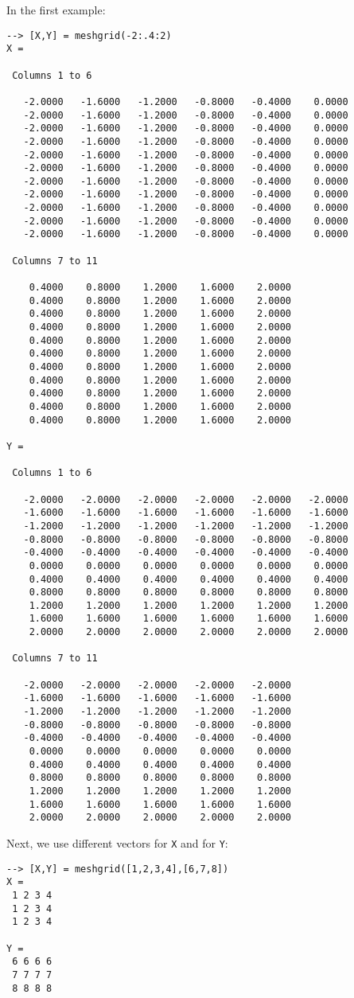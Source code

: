 In the first example:
\begin{verbatim}
--> [X,Y] = meshgrid(-2:.4:2)
X = 

 Columns 1 to 6

   -2.0000   -1.6000   -1.2000   -0.8000   -0.4000    0.0000 
   -2.0000   -1.6000   -1.2000   -0.8000   -0.4000    0.0000 
   -2.0000   -1.6000   -1.2000   -0.8000   -0.4000    0.0000 
   -2.0000   -1.6000   -1.2000   -0.8000   -0.4000    0.0000 
   -2.0000   -1.6000   -1.2000   -0.8000   -0.4000    0.0000 
   -2.0000   -1.6000   -1.2000   -0.8000   -0.4000    0.0000 
   -2.0000   -1.6000   -1.2000   -0.8000   -0.4000    0.0000 
   -2.0000   -1.6000   -1.2000   -0.8000   -0.4000    0.0000 
   -2.0000   -1.6000   -1.2000   -0.8000   -0.4000    0.0000 
   -2.0000   -1.6000   -1.2000   -0.8000   -0.4000    0.0000 
   -2.0000   -1.6000   -1.2000   -0.8000   -0.4000    0.0000 

 Columns 7 to 11

    0.4000    0.8000    1.2000    1.6000    2.0000 
    0.4000    0.8000    1.2000    1.6000    2.0000 
    0.4000    0.8000    1.2000    1.6000    2.0000 
    0.4000    0.8000    1.2000    1.6000    2.0000 
    0.4000    0.8000    1.2000    1.6000    2.0000 
    0.4000    0.8000    1.2000    1.6000    2.0000 
    0.4000    0.8000    1.2000    1.6000    2.0000 
    0.4000    0.8000    1.2000    1.6000    2.0000 
    0.4000    0.8000    1.2000    1.6000    2.0000 
    0.4000    0.8000    1.2000    1.6000    2.0000 
    0.4000    0.8000    1.2000    1.6000    2.0000 

Y = 

 Columns 1 to 6

   -2.0000   -2.0000   -2.0000   -2.0000   -2.0000   -2.0000 
   -1.6000   -1.6000   -1.6000   -1.6000   -1.6000   -1.6000 
   -1.2000   -1.2000   -1.2000   -1.2000   -1.2000   -1.2000 
   -0.8000   -0.8000   -0.8000   -0.8000   -0.8000   -0.8000 
   -0.4000   -0.4000   -0.4000   -0.4000   -0.4000   -0.4000 
    0.0000    0.0000    0.0000    0.0000    0.0000    0.0000 
    0.4000    0.4000    0.4000    0.4000    0.4000    0.4000 
    0.8000    0.8000    0.8000    0.8000    0.8000    0.8000 
    1.2000    1.2000    1.2000    1.2000    1.2000    1.2000 
    1.6000    1.6000    1.6000    1.6000    1.6000    1.6000 
    2.0000    2.0000    2.0000    2.0000    2.0000    2.0000 

 Columns 7 to 11

   -2.0000   -2.0000   -2.0000   -2.0000   -2.0000 
   -1.6000   -1.6000   -1.6000   -1.6000   -1.6000 
   -1.2000   -1.2000   -1.2000   -1.2000   -1.2000 
   -0.8000   -0.8000   -0.8000   -0.8000   -0.8000 
   -0.4000   -0.4000   -0.4000   -0.4000   -0.4000 
    0.0000    0.0000    0.0000    0.0000    0.0000 
    0.4000    0.4000    0.4000    0.4000    0.4000 
    0.8000    0.8000    0.8000    0.8000    0.8000 
    1.2000    1.2000    1.2000    1.2000    1.2000 
    1.6000    1.6000    1.6000    1.6000    1.6000 
    2.0000    2.0000    2.0000    2.0000    2.0000 
\end{verbatim}
Next, we use different vectors for \verb|X| and for \verb|Y|:
\begin{verbatim}
--> [X,Y] = meshgrid([1,2,3,4],[6,7,8])
X = 
 1 2 3 4 
 1 2 3 4 
 1 2 3 4 

Y = 
 6 6 6 6 
 7 7 7 7 
 8 8 8 8 
\end{verbatim}
